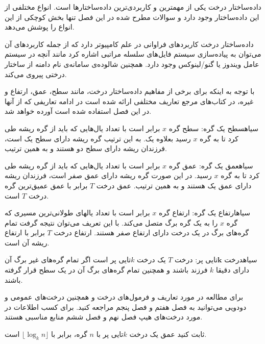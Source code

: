 

داده‌ساختار درخت یکی از مهمترین و کاربردی‌ترین داده‌ساختارها است. انواع مختلفی از این داده‌ساختار وجود دارد و سوالات مطرح شده در این فصل تنها بخش کوچکی از این انواع را پوشش می‌دهد. 

داده‌ساختار درخت کاربردهای فراوانی در علم کامپیوتر دارد که از جمله کاربردهای آن می‌توان به پیاده‌سازی سیستم فایل‌های سلسله مراتبی اشاره کرد مانند آنچه در سیستم عامل ویندوز یا گنو/لینوکس وجود دارد. همچنین شالوده‌ی سامانه‌ی نام دامنه از ساختار درختی پیروی می‌کند.

با توجه به اینکه برای برخی از مفاهیم داده‌ساختار درخت، مانند سطح، عمق، ارتفاع و غیره، در کتاب‌های مرجع تعاریف مختلفی ارائه شده است در ادامه تعاریفی که از آنها در این فصل استفاده شده است آورده خواهد شد.

‌سیاه{سطح یک گره}: سطح گره {$x$} برابر است با تعداد یال‌هایی که باید از گره ریشه طی کرد تا به گره {$x$} رسید بعلاوه یک. به این ترتیب گره ریشه دارای سطح یک است، فرزندان ریشه دارای سطح دو هستند و به همین ترتیب.

‌سیاه{عمق یک گره}: عمق گره {$x$} برابر است با تعداد یال‌هایی که باید از گره ریشه طی کرد تا به گره {$x$} رسید. در این صورت گره ریشه دارای عمق صفر است، فرزندان ریشه دارای عمق یک هستند و به همین ترتیب. عمق درخت {$T$} برابر با عمق عمیق‌ترین گره درخت {$T$} است.

‌سیاه{ارتفاع یک گره}: ارتفاع گره {$x$} برابر است با تعداد یالهای طولانی‌ترین مسیری که گره {$x$} را به یک گره برگ متصل می‌کند. با این تعریف می‌توان نتیجه گرفت تمام گره‌های برگ در یک درخت دارای ارتفاع صفر هستند. ارتفاع درخت {$T$} برابر با ارتفاع ریشه آن است.

‌سیاه{درخت {$\mathbf{k}$}تایی پر}: درخت {$T$} یک درخت {$k$}تایی پر است اگر تمام گره‌های غیر برگ آن دارای دقیقا {$k$} فرزند باشند و همچنین تمام گره‌های برگ آن در یک سطح قرار گرفته باشند.


برای مطالعه در مورد تعاریف و فرمول‌های درخت و همچنین درخت‌های عمومی و دودویی می‌توانید به فصل هفتم {\cite{ebrahimi}} و فصل پنجم {\cite{horowitz}} مراجعه کنید. برای کسب اطلاعات در مورد درخت‌های هیپ فصل نهم {\cite{ebrahimi}} و فصل ششم {\cite{weiss}} منابع مناسبی هستند.


 ثابت کنید عمق یک درخت {$k$}تایی پر با {$n$} گره، برابر با {$\lfloor \log_k n \rfloor$} است.

